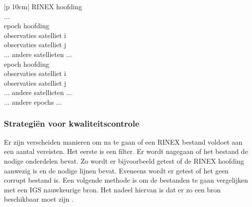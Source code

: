  \newcommand*{\MyIndent}{\hspace*{0.5cm}}%
 \begin{table}[hbp]
 	\caption{Vereenvoudigde samenstelling van een RINEX bestand}		
 	\begin{tabular}{|p {10cm}|}	
 		\hline
 		RINEX hoofding \\
 		... \\ \hline
 		epoch hoofding\\ \hline
 		\MyIndent observaties satelliet i \\ \hline
 		\MyIndent observaties satelliet j \\ \hline
 		... andere satellieten ... \\ \hline
 		epoch hoofding\\ \hline
 		\MyIndent observaties satelliet i \\ \hline
 		\MyIndent observaties satelliet j \\ \hline
 		... andere satellieten ... \\ \hline
 		... andere epochs ... \\ \hline	
 	\end{tabular}
 	\label{TabRTCMBer}
 \end{table}
 
 
\subsubsection{Strategi\"en voor kwaliteitscontrole}
Er zijn verscheiden manieren om na te gaan of een RINEX bestand voldoet aan een aantal vereisten. Het eerste is een filter. Er wordt nagegaan of het bestand de nodige onderdelen bevat. Zo wordt er bijvoorbeeld getest of de RINEX hoofding aanwezig is en de nodige lijnen bevat. Eveneens wordt er getest of het geen corrupt bestand is. Een volgende methode is om de bestanden te gaan vergelijken met een IGS nauwkeurige bron. Het nadeel hiervan is dat er zo een bron beschikbaar moet zijn \cite{LBibRINEX3}. 

